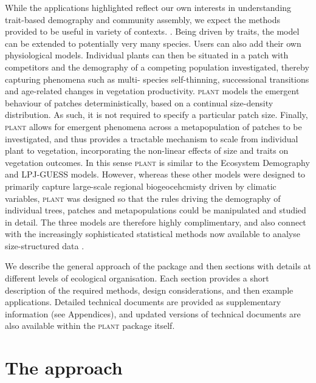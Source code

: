 \documentclass[a4paper,11pt]{article}
\newcommand{\plant}{\textsc{plant}}
\begin{document}
While the applications highlighted reflect our own interests in understanding
trait-based demography and community assembly, we expect the methods provided
to be useful in variety of contexts. . Being driven by traits,
the model can be extended to potentially very many species. Users can also 
add their own physiological models. Individual plants
can then be  situated in a patch with competitors and the demography of a
competing population  investigated, thereby capturing phenomena such as multi-
species self-thinning,  successional transitions and age-related changes in
vegetation productivity. {\plant}  models the emergent behaviour of
patches deterministically, based on a continual  size-density distribution. As
such, it is not required to specify a particular patch size.  Finally,
{\plant} allows for emergent phenomena across a metapopulation of patches
to  be investigated, and thus provides a tractable mechanism to scale from
individual plant to  vegetation, incorporating the non-linear effects of size
and traits on vegetation outcomes. In  this sense {\plant} is similar to
the Ecosystem Demography \citep{Moorcroft-2001}  and LPJ-GUESS
\citep{Smith-2014} models. However, whereas these other models were designed
to primarily capture large-scale regional biogeocehcmisty driven by climatic
variables,  {\plant} was designed so that the rules driving the
demography of individual trees, patches and metapopulations could be
manipulated and studied in detail. The three models are therefore highly 
complimentary, and also connect with the increasingly sophisticated statistical 
methods now available to analyse size-structured data
\citep[e.g.][]{Metcalf-2013}.

We describe the general approach of the package and then sections with
details at different levels of ecological organisation. Each section
provides a short description of the required methods, design
considerations, and then example applications. Detailed technical
documents are provided as supplementary information (see Appendices),
and updated versions of technical documents are also available within
the {\plant} package itself.

\section{The approach}

\end{document}
